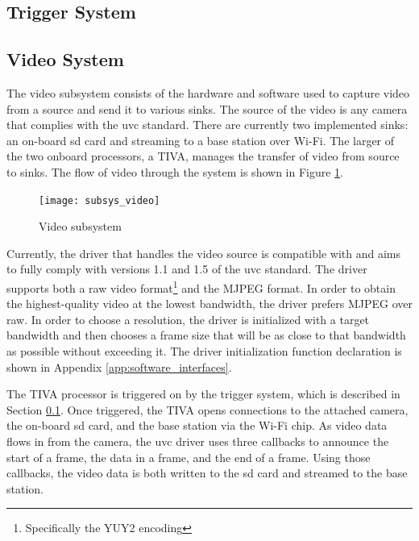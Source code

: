 \documentclass[12pt]{article}
\begin{document}
\subsection{Trigger System}
\label{sec:sys_trigger}

\subsection{Video System}
\label{sec:sys_video}
The video subsystem consists of the hardware and software used to capture video
from a source and send it to various sinks. The source of the video is any
camera that complies with the \gls{uvc} standard. There are currently two
implemented sinks: an on-board \gls{sd} card and streaming to a base station
over Wi-Fi. The larger of the two onboard processors, a TIVA, manages the
transfer of video from source to sinks. The flow of video through the system is
shown in Figure \ref{fig:video_flow}.

\begin{figure}[h]
    \centering
    \texttt{[image: subsys\_video]}
    \caption{Video subsystem}
    \label{fig:video_flow}
\end{figure}

Currently, the driver that handles the video source is compatible with and aims
to fully comply with versions 1.1 and 1.5 of the \gls{uvc}
standard\cite{uvc_standard_11,uvc_standard_15}. The driver supports both a raw
video format\footnote{Specifically the YUY2 encoding} and the MJPEG format. In
order to obtain the highest-quality video at the lowest bandwidth, the driver
prefers MJPEG over raw. In order to choose a resolution, the driver is
initialized with a target bandwidth and then chooses a frame size that will be
as close to that bandwidth as possible without exceeding it. The driver
initialization function declaration is shown in Appendix
\ref{app:software_interfaces}.

The TIVA processor is triggered on by the trigger system, which is described in
Section \ref{sec:sys_trigger}. Once triggered, the TIVA opens connections to
the attached camera, the on-board \gls{sd} card, and the base station via the
Wi-Fi chip. As video data flows in from the camera, the \gls{uvc} driver uses
three callbacks to announce the start of a frame, the data in a frame, and the
end of a frame. Using those callbacks, the video data is both written to the
\gls{sd} card and streamed to the base station.

\end{document}
